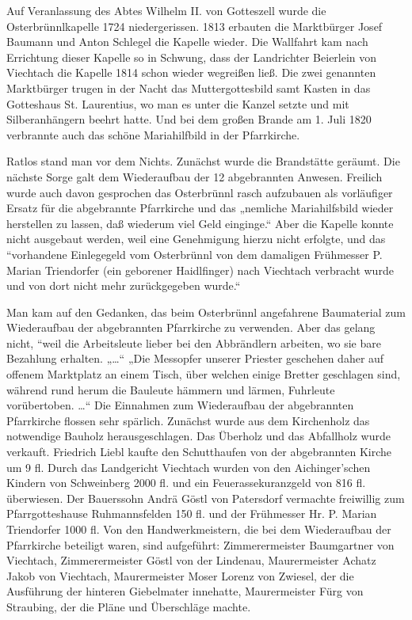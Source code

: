 \documentclass[12pt,a4paper]{book}
\begin{document}
Auf Veranlassung des Abtes Wilhelm II. von Gotteszell wurde die
Osterbrünnlkapelle 1724 niedergerissen. 1813 erbauten die Marktbürger Josef
Baumann und Anton Schlegel die Kapelle wieder. Die Wallfahrt kam nach Errichtung
dieser Kapelle so in Schwung, dass der Landrichter Beierlein von Viechtach die
Kapelle 1814 schon wieder wegreißen ließ. Die zwei genannten Marktbürger trugen
in der Nacht das Muttergottesbild samt Kasten in das Gotteshaus St. Laurentius,
wo man es unter die Kanzel setzte und mit Silberanhängern beehrt hatte. Und bei
dem großen Brande am 1. Juli 1820 verbrannte auch das schöne Mariahilfbild in
der Pfarrkirche.

Ratlos stand man vor dem Nichts. Zunächst wurde die Brandstätte geräumt. Die
nächste Sorge galt dem Wiederaufbau der 12 abgebrannten Anwesen. Freilich wurde
auch davon gesprochen das Osterbrünnl rasch aufzubauen als vorläufiger Ersatz
für die abgebrannte Pfarrkirche und das „nemliche Mariahilfsbild wieder
herstellen zu lassen, daß wiederum viel Geld einginge.“ Aber die Kapelle konnte
nicht ausgebaut werden, weil eine Genehmigung hierzu nicht erfolgte, und das
“vorhandene Einlegegeld vom Osterbrünnl von dem damaligen Frühmesser P. Marian
Triendorfer (ein geborener Haidlfinger) nach Viechtach verbracht wurde und von
dort nicht mehr zurückgegeben wurde.“

Man kam auf den Gedanken, das beim Osterbrünnl angefahrene Baumaterial zum
Wiederaufbau der abgebrannten Pfarrkirche zu verwenden. Aber das gelang nicht,
“weil die Arbeitsleute lieber bei den Abbrändlern arbeiten, wo sie bare
Bezahlung erhalten. „…“ „Die Messopfer unserer Priester geschehen daher auf
offenem Marktplatz an einem Tisch, über welchen einige Bretter geschlagen sind,
während rund herum die Bauleute hämmern und lärmen, Fuhrleute vorübertoben. …“
Die Einnahmen zum Wiederaufbau der abgebrannten Pfarrkirche flossen sehr
spärlich. Zunächst wurde aus dem Kirchenholz das notwendige Bauholz
herausgeschlagen. Das Überholz und das Abfallholz wurde verkauft. Friedrich
Liebl kaufte den Schutthaufen von der abgebrannten Kirche um 9 fl. Durch das
Landgericht Viechtach wurden von den Aichinger'schen Kindern von Schweinberg
2000 fl. und ein Feuerassekuranzgeld von 816 fl. überwiesen. Der Bauerssohn
Andrä Göstl von Patersdorf vermachte freiwillig zum Pfarrgotteshause
Ruhmannsfelden 150 fl. und der Frühmesser Hr. P. Marian Triendorfer 1000 fl. Von
den Handwerkmeistern, die bei dem Wiederaufbau der Pfarrkirche beteiligt waren,
sind aufgeführt: Zimmerermeister Baumgartner von Viechtach, Zimmerermeister
Göstl von der Lindenau, Maurermeister Achatz Jakob von Viechtach, Maurermeister
Moser Lorenz von Zwiesel, der die Ausführung der hinteren Giebelmater innehatte,
Maurermeister Fürg von Straubing, der die Pläne und Überschläge machte.
\end{document}
